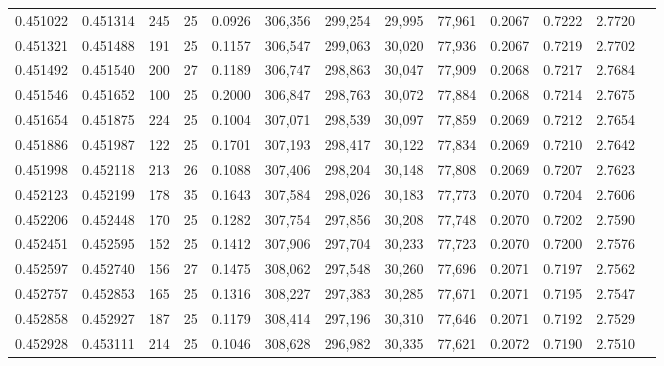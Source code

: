 \begin{tabular}{rrrrrrrrrrrrr}
0.451022 & 0.451314 &   245 &  25 &                                     0.0926 & 306,356 & 299,254 &  29,995 &  77,961 & 0.2067 & 0.7222 & 2.7720 \\
0.451321 & 0.451488 &   191 &  25 &                                     0.1157 & 306,547 & 299,063 &  30,020 &  77,936 & 0.2067 & 0.7219 & 2.7702 \\
0.451492 & 0.451540 &   200 &  27 &                                     0.1189 & 306,747 & 298,863 &  30,047 &  77,909 & 0.2068 & 0.7217 & 2.7684 \\
0.451546 & 0.451652 &   100 &  25 &                                     0.2000 & 306,847 & 298,763 &  30,072 &  77,884 & 0.2068 & 0.7214 & 2.7675 \\
0.451654 & 0.451875 &   224 &  25 &                                     0.1004 & 307,071 & 298,539 &  30,097 &  77,859 & 0.2069 & 0.7212 & 2.7654 \\
0.451886 & 0.451987 &   122 &  25 &                                     0.1701 & 307,193 & 298,417 &  30,122 &  77,834 & 0.2069 & 0.7210 & 2.7642 \\
0.451998 & 0.452118 &   213 &  26 &                                     0.1088 & 307,406 & 298,204 &  30,148 &  77,808 & 0.2069 & 0.7207 & 2.7623 \\
0.452123 & 0.452199 &   178 &  35 &                                     0.1643 & 307,584 & 298,026 &  30,183 &  77,773 & 0.2070 & 0.7204 & 2.7606 \\
0.452206 & 0.452448 &   170 &  25 &                                     0.1282 & 307,754 & 297,856 &  30,208 &  77,748 & 0.2070 & 0.7202 & 2.7590 \\
0.452451 & 0.452595 &   152 &  25 &                                     0.1412 & 307,906 & 297,704 &  30,233 &  77,723 & 0.2070 & 0.7200 & 2.7576 \\
0.452597 & 0.452740 &   156 &  27 &                                     0.1475 & 308,062 & 297,548 &  30,260 &  77,696 & 0.2071 & 0.7197 & 2.7562 \\
0.452757 & 0.452853 &   165 &  25 &                                     0.1316 & 308,227 & 297,383 &  30,285 &  77,671 & 0.2071 & 0.7195 & 2.7547 \\
0.452858 & 0.452927 &   187 &  25 &                                     0.1179 & 308,414 & 297,196 &  30,310 &  77,646 & 0.2071 & 0.7192 & 2.7529 \\
0.452928 & 0.453111 &   214 &  25 &                                     0.1046 & 308,628 & 296,982 &  30,335 &  77,621 & 0.2072 & 0.7190 & 2.7510 \\

\end{tabular}
